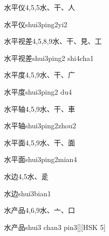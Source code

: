 \begin{Entry}{水平仪}{4,5,5}{⽔、⼲、⼈}
  \begin{Phonetics}{水平仪}{shui3ping2yi2}
  \end{Phonetics}
\end{Entry}

\begin{Entry}{水平视差}{4,5,8,9}{⽔、⼲、⾒、⼯}
  \begin{Phonetics}{水平视差}{shui3ping2 shi4cha1}
  \end{Phonetics}
\end{Entry}

\begin{Entry}{水平度}{4,5,9}{⽔、⼲、⼴}
  \begin{Phonetics}{水平度}{shui3ping2 du4}
  \end{Phonetics}
\end{Entry}

\begin{Entry}{水平轴}{4,5,9}{⽔、⼲、⾞}
  \begin{Phonetics}{水平轴}{shui3ping2zhou2}
  \end{Phonetics}
\end{Entry}

\begin{Entry}{水平面}{4,5,9}{⽔、⼲、⾯}
  \begin{Phonetics}{水平面}{shui3ping2mian4}
  \end{Phonetics}
\end{Entry}

\begin{Entry}{水边}{4,5}{⽔、⾡}
  \begin{Phonetics}{水边}{shui3bian1}
  \end{Phonetics}
\end{Entry}

\begin{Entry}{水产品}{4,6,9}{⽔、⼇、⼝}
  \begin{Phonetics}{水产品}{shui3 chan3 pin3}[][HSK 5]
  \end{Phonetics}
\end{Entry}

